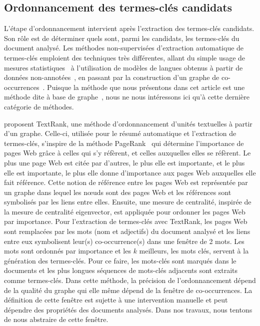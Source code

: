   \subsection{Ordonnancement des termes-clés candidats}
  \label{subsec:ordonnancement_des_termes_cles_candidats}
    L'étape d'ordonnancement intervient après l'extraction des termes-clés
    candidats. Son rôle est de déterminer quels sont, parmi les candidats, les
    termes-clés du document analysé.
    Les méthodes non-supervisées d'extraction automatique de termes-clés
    emploient des techniques très différentes, allant du simple usage de mesures
    statistiques~\cite{jones1972tfidf,paukkeri2010likey} à l'utilisation de
    modèles de langues obtenus à partir de données
    non-annotées~\cite{tomokiyo2003languagemodel}, en passant par la
    construction d'un graphe de co-occurrences~\cite{mihalcea2004textrank}.
    Puisque la méthode que nous présentons dans cet article est une méthode dite
    \og à base de graphe~\fg, nous ne nous intéressons ici qu'à cette dernière
    catégorie de méthodes.

     proposent TextRank, une méthode
    d'ordonnancement d'unités textuelles à partir d'un graphe. Celle-ci,
    utilisée pour le résumé automatique et l'extraction de termes-clés,
    s'inspire de la méthode PageRank~\cite[Google]{brin1998pagerank} qui
    détermine l'importance de pages Web grâce à celles qui s'y réfèrent, et
    celles auxquelles elles se réfèrent. Le plus une page Web est citée par
    d'autres, le plus elle est importante, et le plus elle est importante, le
    plus elle donne d'importance aux pages Web auxquelles elle fait référence.
    Cette notion de référence entre les pages Web est représentée par un graphe
    dans lequel les n\oe{}uds sont des pages Web et les références sont
    symbolisés par les liens entre elles. Ensuite, une mesure de centralité,
    inspirée de la mesure de centralité eigenvector, est appliquée pour ordonner
    les pages Web par importance. Pour l'extraction de termes-clés avec
    TextRank, les pages Web sont remplacées par les mots (nom et adjectifs) du
    document analysé et les liens entre eux symbolisent leur(s) co-occurrence(s)
    dans une fenêtre de 2 mots. Les mots sont ordonnés par importance et les $k$
    meilleurs, les mots clés, servent à la génération des termes-clés. Pour ce
    faire, les mots-clés sont marqués dans le documents et les plus longues
    séquences de mots-clés adjacents sont extraits comme termes-clés. Dans cette
    méthode, la précision de l'ordonnancement dépend de la qualité du graphe qui
    elle même dépend de la fenêtre de co-occurrences. La définition de cette
    fenêtre est sujette à une intervention manuelle et peut dépendre des
    propriétés des documents analysés. Dans nos travaux, nous tentons de nous
    abstraire de cette fenêtre.

